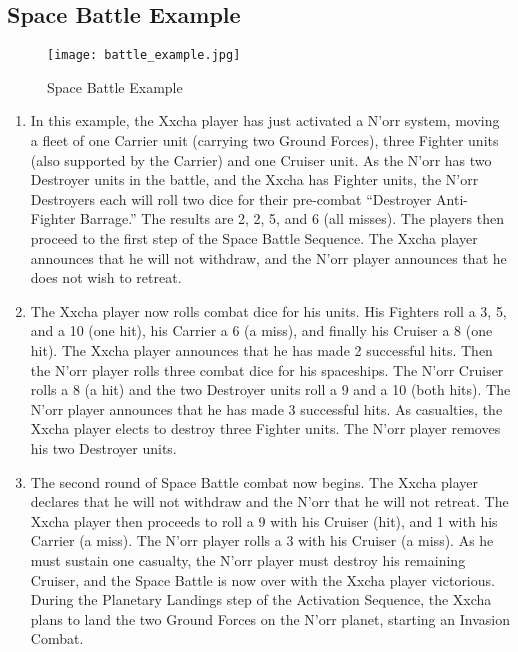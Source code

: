 \documentclass[11pt,fleqn]{book} %
\begin{document}
\subsection{Space Battle Example}

\begin{figure}[h]
    \centering
    \texttt{[image: battle\_example.jpg]}
    \caption{Space Battle Example}
    \label{fig:space_battle_example}
\end{figure}

\begin{enumerate}
    \item In this example, the Xxcha player has just activated a N’orr system, moving a fleet of one Carrier unit (carrying two Ground Forces), three Fighter units (also supported by the Carrier) and one Cruiser unit. As the N’orr has two Destroyer units in the battle, and the Xxcha has Fighter units, the N’orr Destroyers each will roll two dice for their pre-combat “Destroyer Anti-Fighter Barrage.” The results are 2, 2, 5, and 6 (all misses). The players then proceed to the first step of the Space Battle Sequence. The Xxcha player announces that he will not withdraw, and the N’orr player announces that he does not wish to retreat.

\item The Xxcha player now rolls combat dice for his units. His Fighters roll a 3, 5, and a 10 (one hit), his Carrier a 6 (a miss), and finally his Cruiser a 8 (one hit). The Xxcha player announces that he has made 2 successful hits. Then the N’orr player rolls three combat dice for his spaceships. The N’orr Cruiser rolls a 8 (a hit) and the two Destroyer units roll a 9 and a 10 (both hits). The N’orr player announces that he has made 3 successful hits. As casualties, the Xxcha player elects to destroy three Fighter units. The N’orr player removes his two Destroyer units.

\item The second round of Space Battle combat now begins. The Xxcha player declares that he will not withdraw and the N’orr that he will not retreat. The Xxcha player then proceeds to roll a 9 with his Cruiser (hit), and 1 with his Carrier (a miss). The N’orr player rolls a 3 with his Cruiser (a miss). As he must sustain one casualty, the N’orr player must destroy his remaining Cruiser, and the Space Battle is now over with the Xxcha player victorious. During the Planetary Landings step of the Activation Sequence, the Xxcha plans to land the two Ground Forces on the N’orr planet, starting an Invasion Combat.

\end{enumerate}
\end{document}
